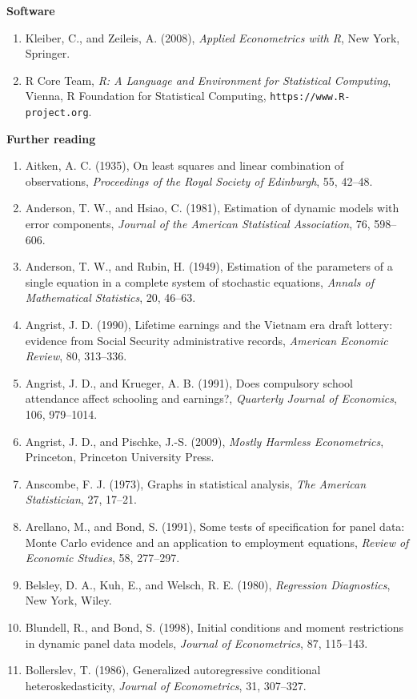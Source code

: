 \documentclass[11pt,a4paper]{article}
\numberwithin{equation}{section}
\theoremstyle{definition}
\newcommand{\subhead}[1]{%
  \par\medskip\noindent\textbf{#1}\par\nobreak\smallskip}
\begin{document}
\subhead{Software}
\begin{enumerate}
\item Kleiber, C., and Zeileis, A. (2008), \emph{Applied Econometrics with R}, New York, Springer.
\item R Core Team, \emph{R: A Language and Environment for Statistical Computing}, Vienna, R Foundation for Statistical Computing,
\texttt{https://www.R-project.org}.
\end{enumerate}

\subhead{Further reading}
\begin{enumerate}
\item Aitken, A. C. (1935), On least squares and linear combination of observations, \emph{Proceedings of the Royal Society of Edinburgh}, 55, 42--48.
\item Anderson, T. W., and Hsiao, C. (1981), Estimation of dynamic models with error components, \emph{Journal of the American Statistical
Association}, 76, 598--606.
\item Anderson, T. W., and Rubin, H. (1949), Estimation of the parameters of a single equation in a complete system of stochastic equations,
\emph{Annals of Mathematical Statistics}, 20, 46--63.
\item Angrist, J. D. (1990), Lifetime earnings and the Vietnam era draft lottery: evidence from Social Security administrative records,
\emph{American Economic Review}, 80, 313--336.
\item Angrist, J. D., and Krueger, A. B. (1991), Does compulsory school attendance affect schooling and earnings?, \emph{Quarterly Journal of
Economics}, 106, 979--1014.
\item Angrist, J. D., and Pischke, J.-S. (2009), \emph{Mostly Harmless Econometrics}, Princeton, Princeton University Press.
\item Anscombe, F. J. (1973), Graphs in statistical analysis, \emph{The American Statistician}, 27, 17--21.
\item Arellano, M., and Bond, S. (1991), Some tests of specification for panel data: Monte Carlo evidence and an application to employment equations,
\emph{Review of Economic Studies}, 58, 277--297.
\item Belsley, D. A., Kuh, E., and Welsch, R. E. (1980), \emph{Regression Diagnostics}, New York, Wiley.
\item Blundell, R., and Bond, S. (1998), Initial conditions and moment restrictions in dynamic panel data models, \emph{Journal of Econometrics}, 87,
115--143.
\item Bollerslev, T. (1986), Generalized autoregressive conditional heteroskedasticity, \emph{Journal of Econometrics}, 31, 307--327.

\end{enumerate}
\end{document}
